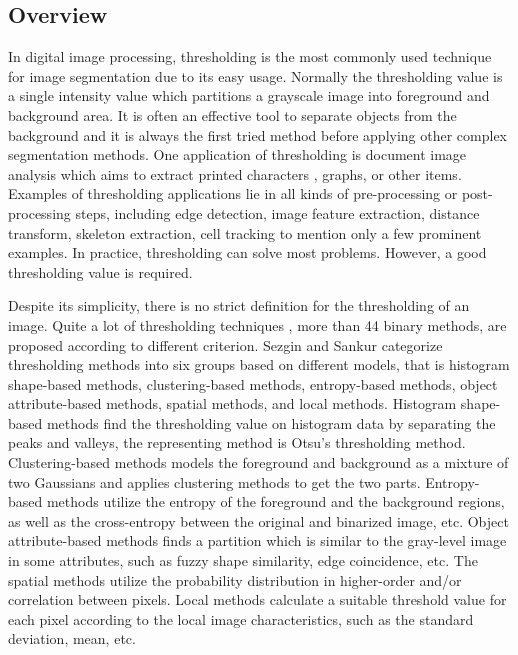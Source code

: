 \subsection{Overview}
In digital image processing, thresholding is the most commonly used technique for image segmentation due to its easy usage. Normally the thresholding value is a single intensity value which partitions a grayscale image into foreground and background area. It is often an effective tool to separate objects from the background and it is always the first tried method before applying other complex segmentation methods. One application of thresholding is document image analysis which aims to extract printed characters \cite{kamel1993extraction,abak1997performance}, graphs, or other items. Examples of thresholding applications lie in all kinds of pre-processing or post-processing steps, including edge detection, image feature extraction, distance transform, skeleton extraction, cell tracking to mention only a few prominent examples. In practice, thresholding can solve most problems. However, a good thresholding value is required.

Despite its simplicity, there is no strict definition for the thresholding of an image. Quite a lot of thresholding techniques \cite{sahoo1988survey, sankur2001image, sezgin2004survey}, more than 44 binary methods, are proposed according to different criterion. Sezgin and Sankur \cite{sankur2001image, sezgin2004survey} categorize thresholding methods into six groups based on different models, that is histogram shape-based methods, clustering-based methods, entropy-based methods, object attribute-based methods, spatial methods, and local methods. Histogram shape-based methods find the thresholding value on histogram data by separating the peaks and valleys, the representing method is Otsu's thresholding method. Clustering-based methods models the foreground and background as a mixture of two Gaussians and applies clustering methods to get the two parts. Entropy-based methods utilize the entropy of the foreground and the background regions, as well as the cross-entropy between the original and binarized image, etc. Object attribute-based methods finds a partition which is similar to the gray-level image in some attributes, such as fuzzy shape similarity, edge coincidence, etc. The spatial methods utilize the probability distribution in higher-order and/or correlation between pixels. Local methods calculate a suitable threshold value for each pixel according to the local image characteristics, such as the standard deviation, mean, etc.

